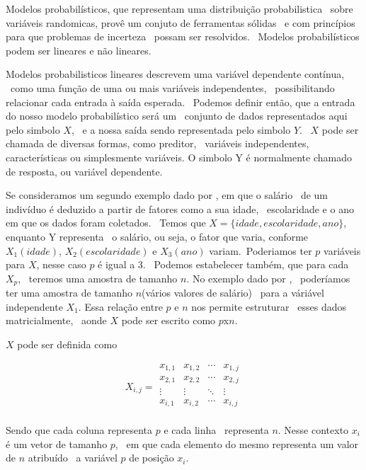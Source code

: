 Modelos probabilísticos, que representam uma distribuição probabilistica \
sobre variáveis randomicas, provê um conjuto de ferramentas sólidas \
e com princípios para que problemas de incerteza \
possam ser resolvidos\cite{Sun}. \
Modelos probabilísticos podem ser lineares e não lineares.

Modelos probabilisticos lineares descrevem uma variável dependente contínua, \
como uma função de uma ou mais variáveis independentes, \
possibilitando relacionar cada entrada à saída esperada. \
Podemos definir então, que a entrada do nosso modelo probabilístico será um \
conjunto de dados representados aqui pelo simbolo $X$, \
e a nossa saída sendo representada pelo simbolo $Y$.  \
$X$ pode ser chamada de diversas formas, como preditor, \
variáveis independentes, características ou simplesmente variáveis.
O simbolo Y é normalmente chamado de resposta, ou variável dependente. \

Se consideramos um segundo exemplo dado por \cite{James}, em que o salário \
de um indivíduo é deduzido a partir de fatores como a sua idade, \
escolaridade e o ano em que os dados foram coletados. \
Temos que $X = \{idade, escolaridade, ano\}$, enquanto Y representa \
o salário, ou seja, o fator que varia, conforme $X_1(idade)$,
$X_2(escolaridade)$ e $X_3(ano)$ variam.\
Poderiamos ter $p$ variáveis para $X$, nesse caso $p$ é igual a 3. \
Podemos estabelecer também, que para cada $X_p$, \
teremos uma amostra de tamanho $n$. No exemplo dado por \cite{James}, \
poderíamos ter uma amostra de tamanho $n$(vários valores de salário) \
para a váriável independente $X_1$.
Essa relação entre $p$ e $n$ nos permite estruturar \
esses dados matricialmente, \
aonde $X$ pode ser escrito como $p$x$n$\cite{James}.

$X$ pode ser definida como

\[
X_{i,j} = \begin{matrix}
x_{1,1} & x_{1,2} & \cdots & x_{1,j} \\
x_{2,1} & x_{2,2} & \cdots & x_{2,j} \\
\vdots  & \vdots  & \ddots & \vdots  \\
x_{i,1} & x_{i,2} & \cdots & x_{i,j} \\
\end{matrix}
\]

Sendo que cada coluna representa $p$ e cada linha \
representa $n$. Nesse contexto $x_i$ é um vetor de tamanho $p$, \
em que cada elemento do mesmo representa um valor de $n$ atribuído \
a variável $p$ de posição $x_i$.

